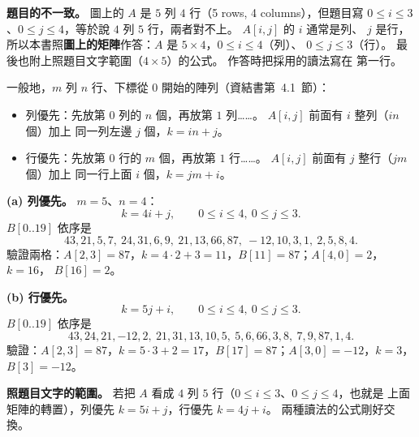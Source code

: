 \begin{pastsoln}
\textbf{題目的不一致。} 圖上的 $A$ 是 $5$ 列 $4$ 行（5 rows, 4 columns），但題目寫
$0 \le i \le 3$、$0 \le j \le 4$，等於說 $4$ 列 $5$ 行，兩者對不上。 $A[i, j]$ 的 $i$ 通常是列、
$j$ 是行，所以本書照\textbf{圖上的矩陣}作答：$A$ 是 $5 \times 4$，$0 \le i \le 4$（列）、
$0 \le j \le 3$（行）。 最後也附上照題目文字範圍（$4 \times 5$）的公式。 作答時把採用的讀法寫在
第一行。

一般地，$m$ 列 $n$ 行、下標從 $0$ 開始的陣列（資結書第~4.1~節）：
\begin{itemize}
\item 列優先：先放第 $0$ 列的 $n$ 個，再放第 $1$ 列……。 $A[i, j]$ 前面有 $i$ 整列（$in$ 個）加上
同一列左邊 $j$ 個，$k = in + j$。
\item 行優先：先放第 $0$ 行的 $m$ 個，再放第 $1$ 行……。 $A[i, j]$ 前面有 $j$ 整行（$jm$ 個）加上
同一行上面 $i$ 個，$k = jm + i$。
\end{itemize}

\textbf{(a) 列優先。} $m = 5$、$n = 4$：
\[
k = 4i + j, \qquad 0 \le i \le 4,\ 0 \le j \le 3 .
\]
$B[0..19]$ 依序是
\[
43, 21, 5, 7,\ 24, 31, 6, 9,\ 21, 13, 66, 87,\ -12, 10, 3, 1,\ 2, 5, 8, 4 .
\]
驗證兩格：$A[2, 3] = 87$，$k = 4 \cdot 2 + 3 = 11$，$B[11] = 87$；$A[4, 0] = 2$，$k = 16$，
$B[16] = 2$。

\textbf{(b) 行優先。}
\[
k = 5j + i, \qquad 0 \le i \le 4,\ 0 \le j \le 3 .
\]
$B[0..19]$ 依序是
\[
43, 24, 21, -12, 2,\ 21, 31, 13, 10, 5,\ 5, 6, 66, 3, 8,\ 7, 9, 87, 1, 4 .
\]
驗證：$A[2, 3] = 87$，$k = 5 \cdot 3 + 2 = 17$，$B[17] = 87$；$A[3, 0] = -12$，$k = 3$，
$B[3] = -12$。

\textbf{照題目文字的範圍。} 若把 $A$ 看成 $4$ 列 $5$ 行（$0 \le i \le 3$、$0 \le j \le 4$，也就是
上面矩陣的轉置），列優先 $k = 5i + j$，行優先 $k = 4j + i$。 兩種讀法的公式剛好交換。
\end{pastsoln}
